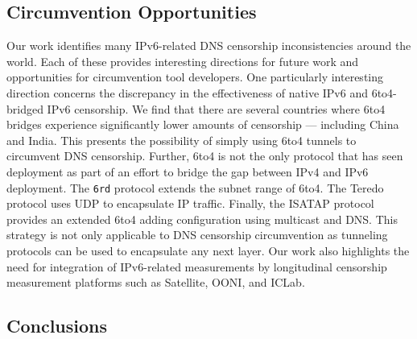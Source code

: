 
\subsection{Circumvention Opportunities}
\label{sec:discussion:future}
Our work identifies many IPv6-related DNS censorship inconsistencies around the
world. Each of these provides interesting directions for future work and
opportunities for circumvention tool developers.
%
One particularly interesting direction concerns the discrepancy in the
effectiveness of native IPv6 and 6to4-bridged IPv6 censorship. We find that
there are several countries where 6to4 bridges experience significantly lower
amounts of censorship --- including China and India. This presents the
possibility of simply using 6to4 tunnels to circumvent DNS censorship. 
%
Further, 6to4 is not the only protocol that has seen deployment as part of an
effort to bridge the gap between IPv4 and IPv6 deployment. The \texttt{6rd}
protocol extends the subnet range of 6to4. The Teredo protocol uses UDP to
encapsulate IP traffic. Finally, the ISATAP protocol provides an extended 6to4
adding configuration using multicast and DNS. This strategy is not only
applicable to DNS censorship circumvention as tunneling protocols can be used to
encapsulate any next layer.
%
Our work also highlights the need for integration of IPv6-related measurements
by longitudinal censorship measurement platforms such as Satellite, OONI, and
ICLab. 

\subsection{Conclusions} \label{sec:discussion:conclusions}

